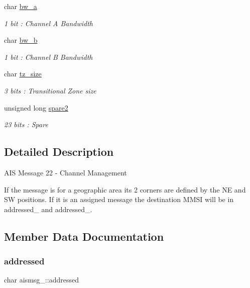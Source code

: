 \begin{DoxyCompactItemize}
char \mbox{\hyperlink{structaismsg__22_af3ba83357d64e2e86302cd8e248e1011}{bw\+\_\+a}}
\begin{DoxyCompactList}\small\item\em 1 bit \+: Channel A Bandwidth \end{DoxyCompactList}\item 
char \mbox{\hyperlink{structaismsg__22_a5a368baceba365a60270255dae616e1e}{bw\+\_\+b}}
\begin{DoxyCompactList}\small\item\em 1 bit \+: Channel B Bandwidth \end{DoxyCompactList}\item 
char \mbox{\hyperlink{structaismsg__22_a39eaf2f56d7b224ea3254b3b4674e56d}{tz\+\_\+size}}
\begin{DoxyCompactList}\small\item\em 3 bits \+: Transitional Zone size \end{DoxyCompactList}\item 
unsigned long \mbox{\hyperlink{structaismsg__22_a04464450dac6d3e0061681f9ee98725f}{spare2}}
\begin{DoxyCompactList}\small\item\em 23 bits \+: Spare \end{DoxyCompactList}\end{DoxyCompactItemize}


\subsection{Detailed Description}
A\+IS Message 22 -\/ Channel Management

If the message is for a geographic area its 2 corners are defined by the NE and SW positions. If it is an assigned message the destination M\+M\+SI will be in addressed\+\_ and addressed\+\_. 

\subsection{Member Data Documentation}
\mbox{\label{structaismsg__22_ac3ed55d23d45cda49607dffb82ebca40}} 
\subsubsection{\texorpdfstring{addressed}{addressed}}
{\footnotesize\ttfamily char aismsg\+\_\+::addressed}



